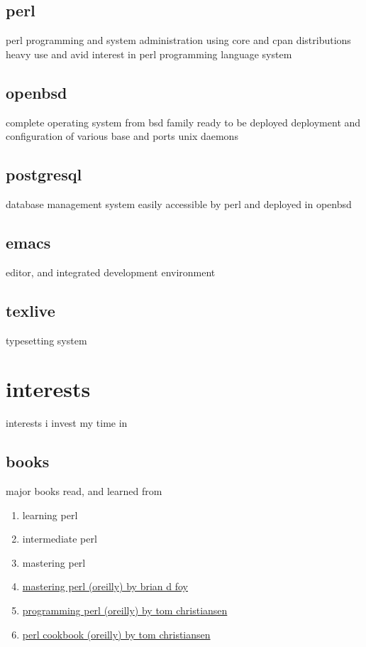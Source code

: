 \documentclass{article}
\begin{document}
\subsection{perl}
perl programming and system administration using core and cpan distributions
heavy use and avid interest in perl programming language system
\subsection{openbsd}
complete operating system from bsd family ready to be deployed
deployment and configuration of various base and ports unix daemons
\subsection{postgresql}
database management system easily accessible by perl and deployed in openbsd
\subsection{emacs}
editor, and integrated development environment
\subsection{texlive}
typesetting system
\section{interests}
interests i invest my time in
\subsection{books}
major books read, and learned from
\begin{enumerate}
\item{learning perl\cite{learning_perl}}
\item{intermediate perl\cite{intermediate_perl}}
\item{mastering perl\cite{mastering_perl}}
\item \href{https://www.oreilly.com/library/view/mastering-perl-2nd/9781449364946/}{mastering perl (oreilly) by brian d foy}
\item \href{https://www.oreilly.com/library/view/programming-perl-4th/9781449321451/}{programming perl (oreilly) by tom christiansen}
\item \href{https://www.oreilly.com/library/view/perl-cookbook-2nd/0596003137/}{perl cookbook (oreilly) by tom christiansen}
\end{enumerate}
\end{document}
